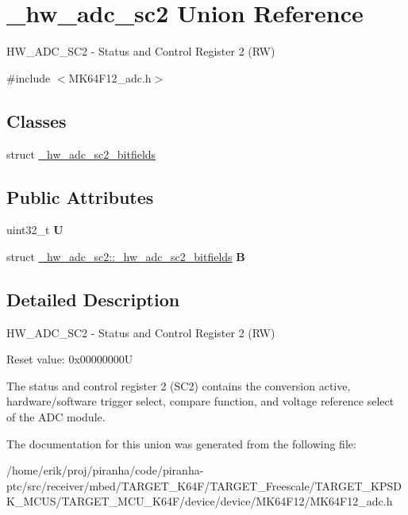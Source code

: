 \hypertarget{union__hw__adc__sc2}{}\section{\+\_\+hw\+\_\+adc\+\_\+sc2 Union Reference}
\label{union__hw__adc__sc2}


H\+W\+\_\+\+A\+D\+C\+\_\+\+S\+C2 -\/ Status and Control Register 2 (RW)  




{\ttfamily \#include $<$M\+K64\+F12\+\_\+adc.\+h$>$}

\subsection*{Classes}
\begin{DoxyCompactItemize}
\item 
struct \hyperlink{struct__hw__adc__sc2_1_1__hw__adc__sc2__bitfields}{\+\_\+hw\+\_\+adc\+\_\+sc2\+\_\+bitfields}
\end{DoxyCompactItemize}
\subsection*{Public Attributes}
\begin{DoxyCompactItemize}
\item 
uint32\+\_\+t {\bfseries U}\hypertarget{union__hw__adc__sc2_a9d90824f218da301399d819fbb51092f}{}\label{union__hw__adc__sc2_a9d90824f218da301399d819fbb51092f}

\item 
struct \hyperlink{struct__hw__adc__sc2_1_1__hw__adc__sc2__bitfields}{\+\_\+hw\+\_\+adc\+\_\+sc2\+::\+\_\+hw\+\_\+adc\+\_\+sc2\+\_\+bitfields} {\bfseries B}\hypertarget{union__hw__adc__sc2_a8337b5a65d8fae7e17feb9a1d720d5c8}{}\label{union__hw__adc__sc2_a8337b5a65d8fae7e17feb9a1d720d5c8}

\end{DoxyCompactItemize}


\subsection{Detailed Description}
H\+W\+\_\+\+A\+D\+C\+\_\+\+S\+C2 -\/ Status and Control Register 2 (RW) 

Reset value\+: 0x00000000U

The status and control register 2 (S\+C2) contains the conversion active, hardware/software trigger select, compare function, and voltage reference select of the A\+DC module. 

The documentation for this union was generated from the following file\+:\begin{DoxyCompactItemize}
\item 
/home/erik/proj/piranha/code/piranha-\/ptc/src/receiver/mbed/\+T\+A\+R\+G\+E\+T\+\_\+\+K64\+F/\+T\+A\+R\+G\+E\+T\+\_\+\+Freescale/\+T\+A\+R\+G\+E\+T\+\_\+\+K\+P\+S\+D\+K\+\_\+\+M\+C\+U\+S/\+T\+A\+R\+G\+E\+T\+\_\+\+M\+C\+U\+\_\+\+K64\+F/device/device/\+M\+K64\+F12/M\+K64\+F12\+\_\+adc.\+h\end{DoxyCompactItemize}
